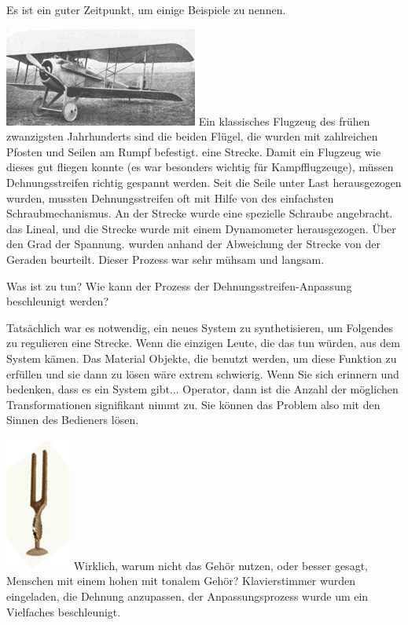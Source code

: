\documentclass[11pt,a4paper]{article}
\begin{document}
{{Es ist ein guter Zeitpunkt, um einige Beispiele zu nennen. 

\includegraphics[width=.3\textwidth]{mts-4.png}
Ein klassisches Flugzeug des frühen zwanzigsten Jahrhunderts sind die beiden Flügel, die
wurden mit zahlreichen Pfosten und Seilen am Rumpf befestigt.
eine Strecke. Damit ein Flugzeug wie dieses gut fliegen konnte (es war besonders wichtig
für Kampfflugzeuge), müssen Dehnungsstreifen richtig gespannt werden. Seit die Seile
unter Last herausgezogen wurden, mussten Dehnungsstreifen oft mit Hilfe von
des einfachsten Schraubmechanismus. An der Strecke wurde eine spezielle Schraube angebracht.
das Lineal, und die Strecke wurde mit einem Dynamometer herausgezogen. Über den Grad der Spannung.
wurden anhand der Abweichung der Strecke von der Geraden beurteilt. Dieser Prozess war sehr
mühsam und langsam.

Was ist zu tun? Wie kann der Prozess der Dehnungsstreifen-Anpassung beschleunigt werden?

Tatsächlich war es notwendig, ein neues System zu synthetisieren, um Folgendes zu regulieren
eine Strecke. Wenn die einzigen Leute, die das tun würden, aus dem System kämen.
Das Material Objekte, die benutzt werden, um diese Funktion zu erfüllen und sie dann zu lösen
wäre extrem schwierig. Wenn Sie sich erinnern und bedenken, dass es ein System gibt...
Operator, dann ist die Anzahl der möglichen Transformationen signifikant
nimmt zu. Sie können das Problem also mit den Sinnen des Bedieners lösen.

\includegraphics[width=.1\textwidth]{mts-5.png}
Wirklich, warum nicht das Gehör nutzen, oder besser gesagt, Menschen mit einem hohen
mit tonalem Gehör? Klavierstimmer wurden eingeladen, die Dehnung anzupassen,
der Anpassungsprozess wurde um ein Vielfaches beschleunigt.

}}
\end{document}
